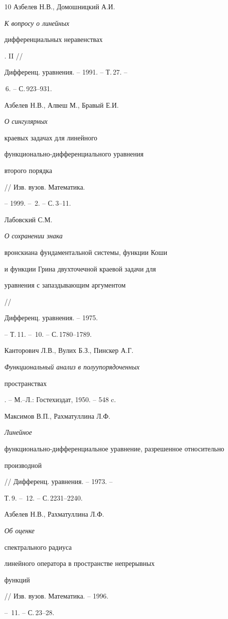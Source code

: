 \begin{thebibliography} {10}
 Азбелев Н.В., Домошницкий А.И.


{\em К вопросу о линейных


дифференциальных неравенствах}. II //


Дифференц. уравнения. -- 1991. -- Т.\,27. --


\No\,6. -- С.\,923--931.





 Азбелев Н.В., Алвеш М., Бравый Е.И. {\em О сингулярных


краевых задачах для линейного


функционально-дифференциального уравнения


второго порядка} // Изв. вузов. Математика.


-- 1999. -- \No\,2. -- С.\,3--11.





 Лабовский С.М. {\em О сохранении знака


вронскиана фундаментальной системы, функции Коши


и функции Грина двухточечной краевой задачи для


уравнения с запаздывающим аргументом} //


Дифференц. уравнения. -- 1975.


-- Т.\,11. -- \No\,10. -- С.\,1780--1789.





 Канторович Л.В., Вулих Б.З., Пинскер А.Г.


{\em Функциональный анализ в полуупорядоченных


пространствах}. -- М.--Л.: Гостехиздат, 1950. -- 548 c.





 Максимов В.П., Рахматуллина Л.Ф. {\em Линейное


функционально-дифференциальное уравнение, разрешенное относительно


производной} // Дифференц. уравнения. -- 1973. --


Т.\,9. -- \No\,12. -- С.\,2231--2240.





 Азбелев Н.В., Рахматуллина Л.Ф. {\em Об оценке


спектрального радиуса


линейного оператора в пространстве непрерывных


функций} // Изв. вузов. Математика. -- 1996.


-- \No\,11. -- С.\,23--28.





\end{thebibliography}





